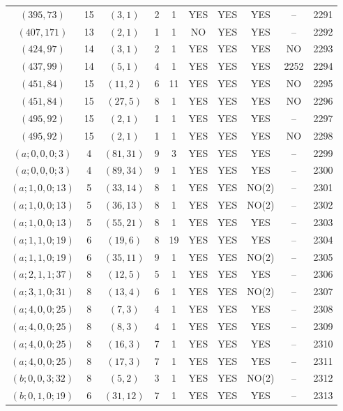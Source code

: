\begin{longtable}{|c|c|c|c|c|c|c|c|c|c|}
$(395, 73)$ & 15 & $(3, 1)$ & 2 & 1 & YES & YES & YES & -- & 2291\\
$(407, 171)$ & 13 & $(2, 1)$ & 1 & 1 & NO & YES & YES & -- & 2292\\
$(424, 97)$ & 14 & $(3, 1)$ & 2 & 1 & YES & YES & YES & NO & 2293\\
$(437, 99)$ & 14 & $(5, 1)$ & 4 & 1 & YES & YES & YES & 2252 & 2294\\
$(451, 84)$ & 15 & $(11, 2)$ & 6 & 11 & YES & YES & YES & NO & 2295\\
$(451, 84)$ & 15 & $(27, 5)$ & 8 & 1 & YES & YES & YES & NO & 2296\\
$(495, 92)$ & 15 & $(2, 1)$ & 1 & 1 & YES & YES & YES & -- & 2297\\
$(495, 92)$ & 15 & $(2, 1)$ & 1 & 1 & YES & YES & YES & NO & 2298\\
$(a; 0, 0, 0; 3)$ & 4 & $(81, 31)$ & 9 & 3 & YES & YES & YES & -- & 2299\\
$(a; 0, 0, 0; 3)$ & 4 & $(89, 34)$ & 9 & 1 & YES & YES & YES & -- & 2300\\
$(a; 1, 0, 0; 13)$ & 5 & $(33, 14)$ & 8 & 1 & YES & YES & NO(2) & -- & 2301\\
$(a; 1, 0, 0; 13)$ & 5 & $(36, 13)$ & 8 & 1 & YES & YES & NO(2) & -- & 2302\\
$(a; 1, 0, 0; 13)$ & 5 & $(55, 21)$ & 8 & 1 & YES & YES & YES & -- & 2303\\
$(a; 1, 1, 0; 19)$ & 6 & $(19, 6)$ & 8 & 19 & YES & YES & YES & -- & 2304\\
$(a; 1, 1, 0; 19)$ & 6 & $(35, 11)$ & 9 & 1 & YES & YES & NO(2) & -- & 2305\\
$(a; 2, 1, 1; 37)$ & 8 & $(12, 5)$ & 5 & 1 & YES & YES & YES & -- & 2306\\
$(a; 3, 1, 0; 31)$ & 8 & $(13, 4)$ & 6 & 1 & YES & YES & NO(2) & -- & 2307\\
$(a; 4, 0, 0; 25)$ & 8 & $(7, 3)$ & 4 & 1 & YES & YES & YES & -- & 2308\\
$(a; 4, 0, 0; 25)$ & 8 & $(8, 3)$ & 4 & 1 & YES & YES & YES & -- & 2309\\
$(a; 4, 0, 0; 25)$ & 8 & $(16, 3)$ & 7 & 1 & YES & YES & YES & -- & 2310\\
$(a; 4, 0, 0; 25)$ & 8 & $(17, 3)$ & 7 & 1 & YES & YES & YES & -- & 2311\\
$(b; 0, 0, 3; 32)$ & 8 & $(5, 2)$ & 3 & 1 & YES & YES & NO(2) & -- & 2312\\
$(b; 0, 1, 0; 19)$ & 6 & $(31, 12)$ & 7 & 1 & YES & YES & YES & -- & 2313\\

\end{longtable}
